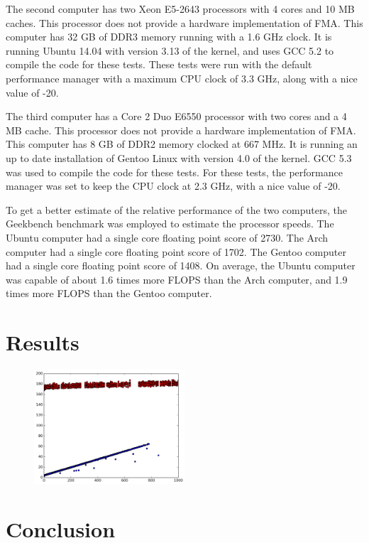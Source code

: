 \documentclass{cccg16}
\begin{document}
The second computer has two Xeon E5-2643 processors with 4 cores and
10 MB caches.  This processor does not provide a hardware
implementation of FMA.  This computer has 32 GB of DDR3 memory running
with a 1.6 GHz clock.  It is running Ubuntu 14.04 with version 3.13 of
the kernel, and uses GCC 5.2 to compile the code for these tests.
These tests were run with the default performance manager with a
maximum CPU clock of 3.3 GHz, along with a nice value of -20.

The third computer has a Core 2 Duo E6550 processor with two cores and
a 4 MB cache.  This processor does not provide a hardware
implementation of FMA.  This computer has 8 GB of DDR2 memory clocked
at 667 MHz.  It is running an up to date installation of Gentoo Linux
with version 4.0 of the kernel.  GCC 5.3 was used to compile the code
for these tests.  For these tests, the performance manager was set to
keep the CPU clock at 2.3 GHz, with a nice value of -20.

To get a better estimate of the relative performance of the two
computers, the Geekbench benchmark was employed to estimate the
processor speeds.  The Ubuntu computer had a single core floating
point score of 2730.  The Arch computer had a single core floating
point score of 1702.  The Gentoo computer had a single core floating
point score of 1408.  On average, the Ubuntu computer was capable of
about 1.6 times more FLOPS than the Arch computer, and 1.9 times more
FLOPS than the Gentoo computer.

\section{Results}

\begin{figure}
  \includegraphics[width=0.5\textwidth]{imgs/hardEllipsoidsSingle_gentoo_adjusted.png}
\end{figure}

\section{Conclusion}



\end{document}
